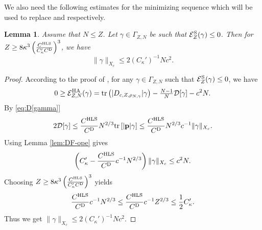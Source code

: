 \documentclass[a4paper]{amsart}
\newtheorem{lemma}{Lemma}
\def\tr{{\rm tr \,}}
\def\bp{{\mathbf p}}
\def\cD{\mathcal{D}}
\def\cE{{\mathcal E}}
\begin{document}
We also need the following estimates for the minimizing sequence which
will be used to replace \cite[Proposition 2.11]{Sere2023} and
\cite[Lemma 3.2]{Sere2023} respectively.
\begin{lemma}\label{lem:bound-DF}
  Assume that $N\leq Z$. Let $\gamma\in \Gamma_{Z,N}$ be such that
  $\cE_Z^{\rm S}(\gamma)\leq 0$.  Then for $Z\geq 8\kappa^3\left(
    \frac{ C^{\rm HLS}}{C_\kappa' C^{\rm D}}\right)^3$, we have
\begin{equation}
    \|\gamma\|_{X_c} \leq 2(C_\kappa')^{-1}Nc^2.
\end{equation}
\end{lemma}
\begin{proof}
According to the proof of \cite[Proposition 2.11]{Sere2023}, for any $\gamma\in \Gamma_{Z,N}$ such that $ \cE_Z^{\rm S}(\gamma)\leq 0$, we have
\begin{equation}
0\geq   \cE_{Z,N}^{\rm HA}(\gamma)=\tr\big(|D_{c,Z,\rho_{N,\gamma}}|\gamma\big) -\tfrac{N-1}{N}\cD[\gamma]-c^2N.
\end{equation}
By \eqref{eq:D[gamma]}
\begin{equation}
    2\cD[\gamma]\leq  \frac{C^{\rm HLS}}{C^{\rm D}}
    N^{2/3}\tr[|\bp|\gamma]\leq  \frac{C^{\rm HLS}}{C^{\rm D}}
    N^{2/3}c^{-1} \|\gamma\|_{X_c}.
\end{equation}
Using Lemma \ref{lem:DF-ope} gives
\begin{equation}
\left( C_\kappa'-\frac{C^{\rm HLS}}{C^{\rm D}}c^{-1}N^{2/3} \right)\|\gamma\|_{X_c}\leq c^2 N.
\end{equation}
Choosing
$Z\geq 8\kappa^3\left( \frac{ C^{\rm HLS}}{C_\kappa' C^{\rm
      D}}\right)^3$ yields
\begin{equation}
    \frac{C^{\rm HLS}}{C^{\rm D}}c^{-1}N^{2/3}\leq \frac{C^{\rm HLS}}{C^{\rm D}}c^{-1}Z^{2/3}\leq\frac{1}{2}C_\kappa'.
\end{equation}
Thus we get $\|\gamma\|_{X_c} \leq 2(C_\kappa')^{-1}Nc^2$.
\end{proof}
\end{document}
